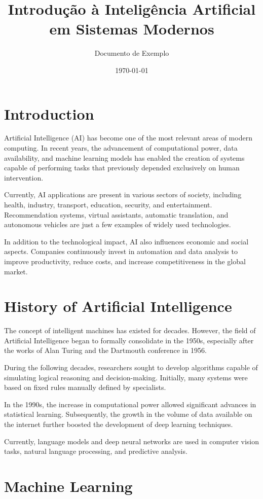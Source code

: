 \documentclass[11pt]{article}
\title{Introdução à Inteligência Artificial em Sistemas Modernos}
\author{Documento de Exemplo}
\date{\today}
\begin{document}
\section{Introduction}

Artificial Intelligence (AI) has become one of the most relevant areas of modern computing.
In recent years, the advancement of computational power, data availability, and machine
learning models has enabled the creation of systems capable of performing tasks that
previously depended exclusively on human intervention.

Currently, AI applications are present in various sectors of society, including health,
industry, transport, education, security, and entertainment. Recommendation systems,
virtual assistants, automatic translation, and autonomous vehicles are just a few examples
of widely used technologies.

In addition to the technological impact, AI also influences economic and social aspects. Companies
continuously invest in automation and data analysis to improve productivity,
reduce costs, and increase competitiveness in the global market. 

\section{History of Artificial Intelligence}

The concept of intelligent machines has existed for decades. However, the field of Artificial
Intelligence began to formally consolidate in the 1950s, especially after the works of Alan
Turing and the Dartmouth conference in 1956.

During the following decades, researchers sought to develop algorithms capable of
simulating logical reasoning and decision-making. Initially, many systems were based on
fixed rules manually defined by specialists.

In the 1990s, the increase in computational power allowed significant advances in
statistical learning. Subsequently, the growth in the volume of data available on the
internet further boosted the development of deep learning techniques.

Currently, language models and deep neural networks are used in computer vision tasks,
natural language processing, and predictive analysis.
 

\section{Machine Learning}
\end{document}
